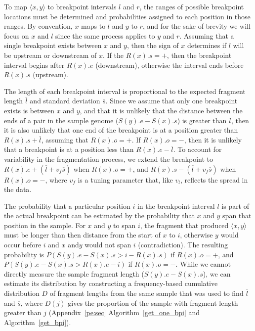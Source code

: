 \documentclass[10pt]{bmc_article}
\newenvironment{bmcformat}{\begin{raggedright}\baselineskip20pt\sloppy\setboolean{publ}{false}}{\end{raggedright}\baselineskip20pt\sloppy}
\begin{document}
\begin{bmcformat}
To map $\langle x,y \rangle$ to breakpoint intervals $l$ and $r$, the ranges of
possible breakpoint locations must be determined and probabilities assigned to
each position in those ranges.  By convention, $x$ maps to $l$ and $y$ to
$r$, and for the sake of brevity we will focus on $x$ and $l$ since the same
process applies to $y$ and $r$.  Assuming that a single breakpoint exists
between $x$ and $y$, then the sign of $x$ determines if $l$ will be upstream
or downstream of $x$.  If the $R(x).s=+$, then the breakpoint interval begins
after $R(x).e$ (downstream), otherwise the interval ends before $R(x).s$
(upstream). 

The length of each breakpoint interval is proportional to the expected fragment
length $\overline{l}$ and standard deviation $\overline{s}$.  Since we assume
that only one breakpoint exists is between $x$ and $y$, and that it is unlikely
that the distance between the ends of a pair in the sample genome ($S(y).e -
S(x).s$) is greater than $\overline{l}$, then it is also unlikely that one end
of the breakpoint is at a position greater than $R(x).s + \overline{l}$,
assuming that $R(x).o=+$. If $R(x).o=-$, then it is unlikely that a breakpoint
is at a position less than $R(x).e - \overline{l}$.  To account for variability
in the fragmentation process, we extend the breakpoint to
$R(x).e + (\overline{l} + v_f\overline{s})$ when $R(x).o=+$, and
$R(x).s - (\overline{l} + v_f\overline{s})$ when $R(x).o=-$,
where $v_f$ is a tuning parameter that, like $v_l$, reflects the spread in the
data.

The probability that a particular position $i$ in the breakpoint interval $l$ is
part of the actual breakpoint can be estimated by the probability that $x$ and
$y$ span that position in the sample. For $x$ and $y$ to span $i$, the fragment
that produced $\langle x,y \rangle$ must be longer than then distance from the
start of $x$ to $i$, otherwise $y$ would occur before $i$ and $x$ and$y$ would
not span $i$ (contradiction).  The resulting probability is
$P(S(y).e - S(x).s > i - R(x).s)$ if $R(x).o=+$, and
$P(S(y).e - S(x).s > R(x).e - i)$ if $R(x).o=-$.
While we cannot directly measure the sample fragment length ($S(y).e - S(x).s$),
we can estimate its distribution by constructing a frequency-based cumulative
distribution $D$ of fragment lengths from the same sample that was used to find
$\overline{l}$ and $\overline{s}$, where $D(j)$ gives the proportion of the
sample with fragment length greater than $j$ (Appendix~\ref{pe:sec}
Algorithm~\ref{get_one_bpi} and Algorithm~\ref{get_bpi}).


\end{bmcformat}
\end{document}
